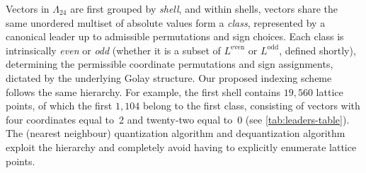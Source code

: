 \documentclass{article}
\theoremstyle{plain}
\theoremstyle{definition}
\theoremstyle{remark}
\begin{document}
Vectors in $\Lambda_{24}$ are first grouped by \emph{shell}, and within shells, vectors share the same unordered multiset of absolute values form a \emph{class}, represented by a canonical leader up to admissible permutations and sign choices. Each class is intrinsically \emph{even} or \emph{odd} (whether it is a subset of $L^{\text{even}}$ or $L^{\text{odd}}$, defined shortly), determining the permissible coordinate permutations and sign assignments, dictated by the underlying Golay structure. Our proposed indexing scheme follows the same hierarchy. For example, the first shell contains $19{,}560$ lattice points, of which the first $1{,}104$ belong to the first class, consisting of vectors with four coordinates equal to~2 and twenty‑two equal to~0 (see \autoref{tab:leaders-table}). The (nearest neighbour) quantization algorithm and dequantization algorithm exploit the hierarchy and completely avoid having to explicitly enumerate lattice points.
\end{document}
